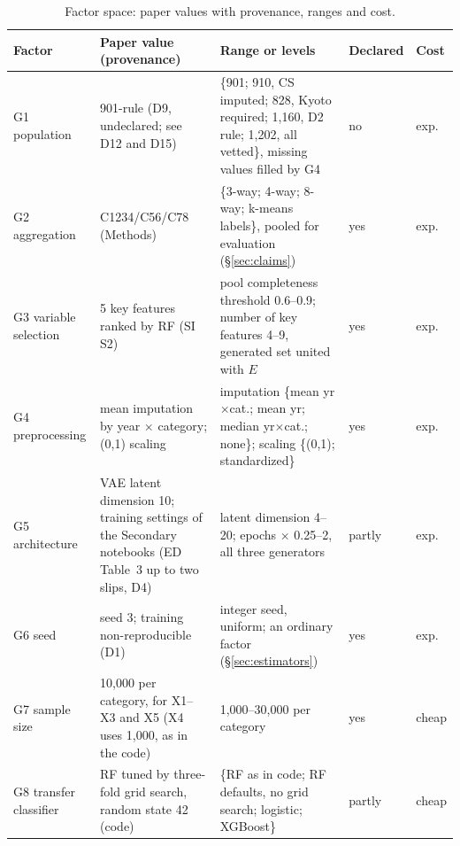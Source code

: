 \documentclass[11pt,a4paper]{article}
\newcommand{\prop}[1]{#1}
\newcommand{\prop}[1]{\textcolor{blue}{#1}}
\begin{document}
\begin{table}[H]
\caption{Factor space: paper values with provenance, ranges and cost.}
\label{tab:factors}
\footnotesize
\begin{tabularx}{\textwidth}{@{}l Y Y l l@{}}
\toprule
Factor & Paper value (provenance) & Range or levels & Declared & Cost\\
\midrule
G1 population & 901-rule (D9, undeclared; see D12 \prop{and D15}) &
  \{901; 910, CS imputed; 828, Kyoto required; 1{,}160, D2 rule;
  1{,}202, all vetted\}, missing values filled by G4 & no & exp.\\
G2 aggregation & C1234/C56/C78 (Methods) &
  \{3-way; 4-way; 8-way; k-means labels\}, pooled for evaluation
  (\S\ref{sec:claims}) & yes & exp.\\
G3 variable selection & 5 key features ranked by RF (SI S2) &
  pool completeness threshold 0.6--0.9; number of key features 4--9,
  generated set united with $E$ & yes & exp.\\
G4 preprocessing & mean imputation by year $\times$ category; (0,1)
  scaling & imputation \{mean yr$\times$cat.; mean yr; median
  yr$\times$cat.; none\}; scaling \{(0,1); standardized\} & yes & exp.\\
G5 architecture & VAE latent dimension 10; training settings of the
  Secondary notebooks (ED Table~3 up to two slips, D4) & latent dimension
  4--20; epochs $\times$ 0.25--2, all three generators & partly & exp.\\
G6 seed & seed 3; training non-reproducible (D1) & integer seed,
  uniform; an ordinary factor (\S\ref{sec:estimators}) & yes & exp.\\
G7 sample size & 10{,}000 per category, for X1--X3 and X5 (X4
  uses 1{,}000, as in the code) & 1{,}000--30{,}000 per category & yes & cheap\\
G8 transfer classifier & RF tuned by three-fold grid search, random
  state 42 (code) & \{RF as in code; RF defaults, no grid search;
  logistic; XGBoost\} & partly & cheap\\
\bottomrule
\end{tabularx}
\end{table}
\end{document}

